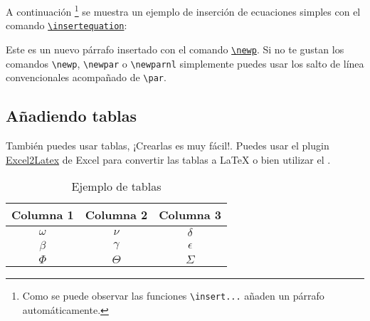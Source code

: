 		A continuación \footnote{Como se puede observar las funciones \texttt{\textbackslash insert...} añaden un párrafo automáticamente.} se muestra un ejemplo de inserción de ecuaciones simples con el comando \href{http://latex.ppizarror.com/informe.html#hlp-formulae}{\texttt{\textbackslash insertequation}}:
		
		
		\lipsum[75]
		
		\newp Este es un nuevo párrafo insertado con el comando \href{http://latex.ppizarror.com/informe.html#hlp-parrafo}{\texttt{\textbackslash newp}}. Si no te gustan los comandos \texttt{\textbackslash newp}, \texttt{\textbackslash newpar} o \texttt{\textbackslash newparnl} simplemente puedes usar los salto de línea convencionales acompañado de \texttt{\textbackslash par}.
		
	\subsection{Añadiendo tablas}
		
		También puedes usar tablas, ¡Crearlas es muy fácil!. Puedes usar el plugin \href{https://www.ctan.org/tex-archive/support/excel2latex/}{Excel2Latex} \cite{ref2} de Excel para convertir las tablas a \LaTeX\xspace o bien utilizar el  \cite{ref3}.
		
		\begin{table}[htbp]
			\centering
			\caption{Ejemplo de tablas}
			\begin{tabular}{ccc}
				\hline
				\textbf{Columna 1} & \textbf{Columna 2} & \textbf{Columna 3} \bigstrut\\
				\hline
				$\omega$ & $\nu$ & $\delta$ \bigstrut[t]\\
				$\beta$ & $\gamma$ & $\epsilon$ \\
				$\Phi$ & $\Theta$ & $\varSigma$ \bigstrut[b]\\
				\hline
			\end{tabular}
			\label{tab:tabla-1}
		\end{table}

